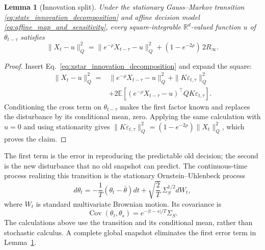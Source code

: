 \documentclass[11pt]{article}
\newtheorem{lemma}{Lemma}
\begin{document}
\begin{lemma}[Innovation split]
\label{lem:innovation_split}
Under the stationary Gauss--Markov transition
\eqref{eq:state_innovation_decomposition} and affine decision model
\eqref{eq:affine_map_and_sensitivity}, every square-integrable
$\mathbb R^d$-valued function $u$ of $\theta_{t-\tau}$ satisfies
\begin{equation}
\|X_t-u\|_Q^2=\|e^{-\rho}X_{t-\tau}-u\|_Q^2
+(1-e^{-2\rho})\,2R_\infty.
\label{eq:innovation_split}
\end{equation}
\end{lemma}
\begin{proof}
Insert Eq.~\eqref{eq:xstar_innovation_decomposition} and expand the square:
\begin{align*}
\|X_t-u\|_Q^2
={}&\|e^{-\rho}X_{t-\tau}-u\|_Q^2+\|K\varepsilon_{t,\tau}\|_Q^2\\
&+2\mathbb E[(e^{-\rho}X_{t-\tau}-u)^\top QK\varepsilon_{t,\tau}].
\end{align*}
Conditioning the cross term on $\theta_{t-\tau}$ makes the first factor
known and replaces the disturbance by its conditional mean, zero.
Applying the same calculation with $u=0$ and using stationarity gives
$\|K\varepsilon_{t,\tau}\|_Q^2=(1-e^{-2\rho})\|X_t\|_Q^2$,
which proves the claim.
\end{proof}

The first term is the error in reproducing the predictable old decision;
the second is the new disturbance that no old snapshot can predict.
The continuous-time process realizing this transition is the stationary
Ornstein--Uhlenbeck process
\begin{equation}
    d\theta_t
    =
    -\frac{1}{T}
    \left(
        \theta_t-\bar{\theta}
    \right)dt
    +
    \sqrt{\frac{2}{T}}\,
    \Sigma_S^{1/2}dW_t,
    \label{eq:OU_process}
\end{equation}
where $W_t$ is standard multivariate Brownian motion. Its covariance is
\begin{equation}
\operatorname{Cov}(\theta_t,\theta_s)=e^{-|t-s|/T}\Sigma_S.
\label{eq:separable_space_time_covariance}
\end{equation}
The calculations above use the transition and its conditional mean, rather
than stochastic calculus. A complete global snapshot eliminates the first
error term in Lemma~\ref{lem:innovation_split}.
\end{document}
